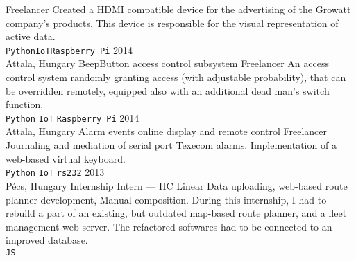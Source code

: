\documentclass[9pt]{developercv} %
\begin{document}
\begin{entrylist}
        {Freelancer}
        {Created a HDMI compatible device for the advertising of the Growatt company’s products. This device is responsible
            for the visual representation of active data.
            \\ \texttt{Python}\slashsep\texttt{IoT}\slashsep\texttt{Raspberry Pi}}
    \entry
        {2014 \\ Attala, Hungary}
        {BeepButton access control subsystem}
        {Freelancer}
        {An access control system randomly granting access (with adjustable probability), that can be overridden remotely,
            equipped also with an additional dead man’s switch function.\\
            \texttt{Python}\slashsep
            \texttt{IoT}\slashsep
            \texttt{Raspberry Pi}
        }
    \entry
        {2014 \\ Attala, Hungary}
        {Alarm events online display and remote control}
        {Freelancer}
        {Journaling and mediation of serial port Texecom alarms. Implementation of a web-based virtual keyboard.\\
            \texttt{Python}\slashsep
            \texttt{IoT}\slashsep
            \texttt{rs232}
        }
    \entry
        {2013 \\ Pécs, Hungary}
        {Internship}
        {Intern --- HC Linear}
        {Data uploading, web-based route planner development, Manual composition. During this internship, I had to rebuild a
            part of an existing, but outdated map-based route planner, and a fleet management web server. The refactored
            softwares had to be connected to an improved database.\\
            \texttt{JS}
        }
\end{entrylist}

\end{document}
